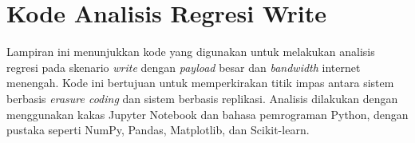 \chapter{Kode Analisis Regresi Write}
\label{appendix:write-regression-code}

Lampiran ini menunjukkan kode yang digunakan untuk melakukan analisis regresi pada skenario \textit{write} dengan \textit{payload} besar dan \textit{bandwidth} internet menengah. Kode ini bertujuan untuk memperkirakan titik impas antara sistem berbasis \textit{erasure coding} dan sistem berbasis replikasi. Analisis dilakukan dengan menggunakan kakas Jupyter Notebook dan bahasa pemrograman Python, dengan pustaka seperti NumPy, Pandas, Matplotlib, dan Scikit-learn.

